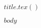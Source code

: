 \documentclass[Harvard,Times1COL]{WileyNJDv5}
\begin{document}
$title.tex()$

$body$
\end{document}
